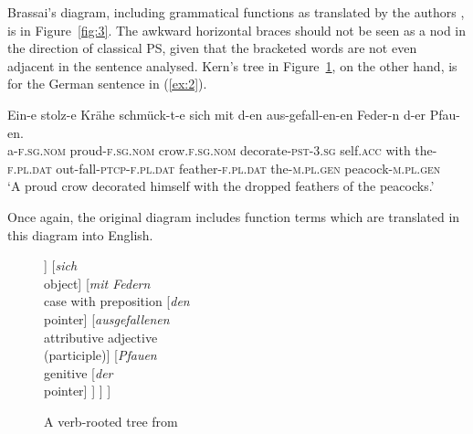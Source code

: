 \documentclass[output=paper
	        ,collection
	        ,collectionchapter
 	        ,biblatex
                ,babelshorthands
                ,newtxmath
                ,draftmode
                ,colorlinks, citecolor=brown
]{langscibook}
\begin{document}
Brassai’s diagram, including grammatical functions as translated by the authors \citep{ImrenyiVladarTBA}, is in Figure~\ref{fig:3}. The awkward horizontal braces should not be seen as a nod in the direction of classical PS, given that the bracketed words are not even adjacent in the sentence analysed. Kern’s tree in Figure~\ref{fig:4}, on the other hand, is for the German sentence in (\ref{ex:2}).

\ea
\label{ex:2}
\gll Ein-e stolz-e Krähe schmück-t-e sich mit d-en aus-gefall-en-en Feder-n d-er Pfau-en.\\
	a\textsc{-f.sg.nom} proud\textsc{-f.sg.nom} crow\textsc{.f.sg.nom} decorate\textsc{-pst}\textsc{-3.sg} self\textsc{.acc} with the\textsc{-f.pl.dat} out-fall-\textsc{ptcp}-\textsc{f.pl.dat} feather\textsc{-f.pl.dat} the\textsc{-m.pl.gen} peacock-\textsc{m.pl.gen}\\

	\glt ‘A proud crow decorated himself with the dropped feathers of the peacocks.’
\z

Once again, the original diagram includes function terms which are translated in this diagram into English.

\begin{figure}
	\centering
\begin{forest}
[\emph{schmückte}\\finite verb
	[\emph{Krähe}\\subject word
		[\emph{eine}\\counter]
		[\emph{stolze}\\attributive adjective]
	]
	[\emph{sich}\\object]
	[\emph{mit Federn}\\case with preposition
		[\emph{den}\\pointer]
		[\emph{ausgefallenen}\\attributive adjective\\(participle)]
		[\emph{Pfauen}\\genitive
			[\emph{der}\\pointer]
		]
	]
]
\end{forest}
	\caption{A verb-rooted tree from \citet{Kern1884a-u}}
	\label{fig:4}
\end{figure}
\end{document}

